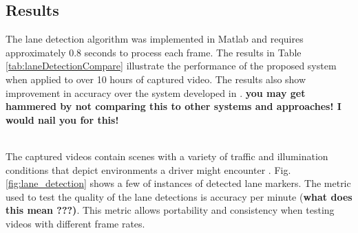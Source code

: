 \documentclass{article}
\begin{document}
\subsection{Results}
The lane detection algorithm was implemented in Matlab and requires
approximately 0.8 seconds to process each frame.
The results in Table \ref{tab:laneDetectionCompare} illustrate the performance of the proposed system when applied to over 10 hours of captured video. The results also show improvement in accuracy over the system developed in \cite{borkar_layered_2009}. {\bf you may get hammered by not comparing this to other systems and approaches!  I would nail you for this!}
\begin{table}[htb!]
\caption{Comparing accuracies of lane detection system}
\label{tab:laneDetectionCompare}
\end{table}\\
The captured videos contain scenes with a variety of traffic and illumination conditions that depict environments a driver might encounter \cite{borkar_layered_2009}. Fig. \ref{fig:lane_detection} shows a few of instances of detected lane markers.
The metric used to test the quality of the lane detections is accuracy per minute {(\bf what does this mean ???)}. This metric allows portability and consistency when testing videos with different frame rates.
\end{document}
